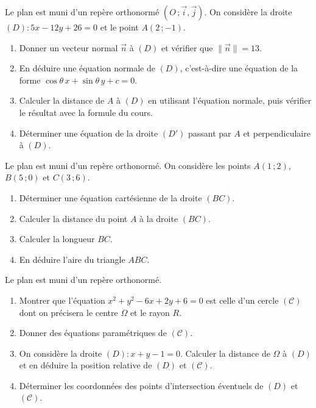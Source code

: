 \documentclass[11pt]{article}
\newcounter{popsec}
\newcounter{popsub}
\newcommand{\courssub}[1]{%
  \stepcounter{popsub}%
  \par\vspace{9pt}\noindent{\popxbold\fontsize{11.5}{13}\selectfont\color{popink}{\color{poporange}\thepopsec.\thepopsub}\hspace{6pt}#1}\par\nopagebreak\vspace{4pt}
}
\begin{document}
\courssub{Je m'entraîne}

\begin{exercice}
Le plan est muni d'un repère orthonormé $(O\,;\vec{i},\vec{j})$. On considère la droite $(D) : 5x - 12y + 26 = 0$ et le point $A(2\,;-1)$.
\begin{enumerate}
\item Donner un vecteur normal $\vec{n}$ à $(D)$ et vérifier que $\|\vec{n}\| = 13$.
\item En déduire une équation normale de $(D)$, c'est-à-dire une équation de la forme $\cos\theta\, x + \sin\theta\, y + c = 0$.
\item Calculer la distance de $A$ à $(D)$ en utilisant l'équation normale, puis vérifier le résultat avec la formule du cours.
\item Déterminer une équation de la droite $(D')$ passant par $A$ et perpendiculaire à $(D)$.
\end{enumerate}
\end{exercice}

\begin{exercice}
Le plan est muni d'un repère orthonormé. On considère les points $A(1\,;2)$, $B(5\,;0)$ et $C(3\,;6)$.
\begin{enumerate}
\item Déterminer une équation cartésienne de la droite $(BC)$.
\item Calculer la distance du point $A$ à la droite $(BC)$.
\item Calculer la longueur $BC$.
\item En déduire l'aire du triangle $ABC$.
\end{enumerate}
\end{exercice}

\begin{exercice}
Le plan est muni d'un repère orthonormé.
\begin{enumerate}
\item Montrer que l'équation $x^2 + y^2 - 6x + 2y + 6 = 0$ est celle d'un cercle $(\mathscr{C})$ dont on précisera le centre $\Omega$ et le rayon $R$.
\item Donner des équations paramétriques de $(\mathscr{C})$.
\item On considère la droite $(D) : x + y - 1 = 0$. Calculer la distance de $\Omega$ à $(D)$ et en déduire la position relative de $(D)$ et $(\mathscr{C})$.
\item Déterminer les coordonnées des points d'intersection éventuels de $(D)$ et $(\mathscr{C})$.
\end{enumerate}
\end{exercice}
\end{document}

